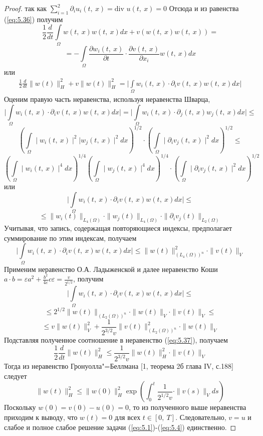\begin{proof}
    так как $\sum\limits_{i=1}^{2}\partial_iu_i(t, \ x)= \textrm{div } u(t, \ x)=0$
    Отсюда и из равенства (\ref{eq:5.36}) получим
    $$\frac{1}{2}\frac{d}{dt}\int\limits_\Omega w(t, \ x)w(t, \ x)dx+v(w(t, \ x)w(t, \ x))=$$
    $$=-\int\limits_\Omega\frac{\partial w_i(t, \ x)}{\partial t}\cdot\frac{\partial v(t, \ x)}{\partial x_i}w(t, \ x)dx$$
    или
    \begin{equation}\label{eq:5.37}
        \begin{gathered}
            \frac{1}{2}\frac{d}{dt}\parallel w(t)\parallel_H^2+v\parallel w(t)\parallel_H^2=
            \bigg|\int\limits_\Omega w_i(t, \ x)\cdot\partial_iv(t, \ x)w(t, \ x)dx\bigg|
        \end{gathered}
    \end{equation}
    Оценим правую часть неравенства, используя неравенства Шварца,
    $$\bigg|\int\limits_\Omega w_i(t, \ x)\cdot\partial_iv(t, \ x)w(t, \ x)dx\bigg|=
    \bigg|\int\limits_\Omega w_i(t, \ x)\cdot\partial_j(t, \ x)w_j(t, \ x)dx\bigg|\le$$
    $$\left(\int\limits_\Omega \mid w_i(t, \ x)\mid^2|w_j(t, \ x)\mid^2dx \right)^{1/2}
    \cdot\left(\int\limits_\Omega\mid\partial_iv_j(t, \ x) \mid^2dx \right)^{1/2}\le$$
    $$\left(\int\limits_\Omega \mid w_i(t, \ x)\mid^4dx\right)^{1/4}\left(\int\limits_\Omega \mid w_j(t, \ x)\mid^4dx\right)^{1/4}
    \cdot\left(\int\limits_\Omega\mid\partial_iv_j(t, \ x) \mid^2dx \right)^{1/2}$$
    или
    $$\bigg|\int\limits_\Omega w_i(t, \ x)\cdot\partial_iv(t, \ x)w(t, \ x)dx\bigg|\le$$
    $$\le\parallel w_i(t)\parallel_{L_4(\Omega)}\cdot\parallel w_j(t)\parallel_{L_4(\Omega)}\cdot\parallel\partial_iv_j(t)\parallel_{L_2(\Omega)}$$
    Учитывая, что запись, содержащая повторяющиеся индексы, предполагает суммирование по этим индексам, получаем
    $$\bigg|\int\limits_\Omega w_i(t, \ x)\cdot\partial_iv(t, \ x)w(t, \ x)dx\bigg|\le\parallel w(t)\parallel_{(L_4(\Omega))^n}^2\cdot\parallel v(t)\parallel_V$$
    Применим неравенство О.А. Ладыженской и далее неравенство Коши \linebreak
    $a\cdot b=\varepsilon a^2+\frac{b^2}{4\varepsilon}c\varepsilon=\frac{v}{2^{1/2}}$, получим
    $$\bigg|\int\limits_\Omega w_i(t, \ x)\cdot\partial_iv(t, \ x)w(t, \ x)dx\bigg|\le$$
    $$\le 2^{1/2}\parallel w(t)\parallel_{(L_2(\Omega))^n}\cdot\parallel w(t)\parallel_V\cdot\parallel v(t)\parallel_V\le$$
    $$\le v\parallel w(t)\parallel_V^2+\frac{1}{2^{3/2}v}\parallel v(t)\parallel_{(L_2(\Omega))^n}^2\cdot\parallel w(t)\parallel_V$$
    Подставляя полученное соотношение в неравенство (\ref{eq:5.37}), получаем
    $$\frac{1}{2}\frac{d}{dt}\parallel w(t)\parallel_H^2\le\frac{1}{2^{3/2}v}\parallel w(t)\parallel_H^2\cdot\parallel v(t)\parallel_V$$
    Тогда из неравенство Гронуолла"=Беллмана [1, теорема 2б глава IV, с.188] следует
    $$\parallel w(t)\parallel_H^2\le\parallel w(0)\parallel_H^2\exp\left(\int_0^t\frac{1}{2^{1/2}v}\cdot\parallel v(s)\parallel_Vds\right)$$
    Поскольку $w(0) = v(0)- u(0) = 0$, то из полученного выше неравенства приходим к выводу,
    что $w(t)=0$ для всех $t\in[0, \ T]$. Следовательно, $v=u$ и слабое и полное слабое решение задачи (\ref{eq:5.1})-(\ref{eq:5.4}) единственно.
\end{proof}
